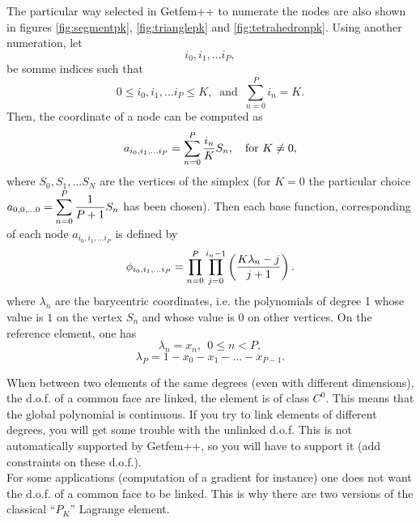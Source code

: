\documentclass[10pt,a4paper]{article}
\begin{document}
The particular way selected in {\sc Getfem++} to numerate the nodes are also shown in figures \ref{fig:segmentpk}, \ref{fig:trianglepk} and \ref{fig:tetrahedronpk}. Using another numeration, let 
$$ i_0, i_1, ... i_P, $$
be somme indices such that
$$ 0 \leq i_0, i_1, ... i_P \leq K, \ \mbox{ and } \ \sum_{n = 0}^{P} i_n = K.$$
Then, the coordinate of a node can be computed as
$$ a_{i_0, i_1, ... i_P} = \sum_{n = 0}^{P} {\displaystyle \frac{\displaystyle i_n}{\displaystyle K}}S_n, \ \ \mbox{ for } K \neq 0, $$
where $S_0, S_1, ... S_N$ are the vertices of the simplex (for $K = 0$ the particular choice $a_{0, 0, ... 0} = \displaystyle \sum_{n = 0}^{P} {\displaystyle \frac{\displaystyle 1}{\displaystyle P+1}}S_n$ has been chosen).
Then each base function, corresponding of each node $a_{i_0, i_1, ... i_P}$ is defined by
$$ \phi_{i_0, i_1, ... i_P} = \prod_{n = 0}^{P} \prod_{j=0}^{i_n-1} \left({\displaystyle \frac{\displaystyle K \lambda_n - j}{\displaystyle j+1}}\right).$$
where $\lambda_n$ are the barycentric coordinates, i.e. the polynomials of degree 1 whose value is $1$ on the vertex $S_n$ and whose value is $0$ on other vertices. On the reference element, one has
$$ \lambda_n = x_n, \ \ 0 \leq n < P, $$
$$ \lambda_P = 1 - x_0 - x_1 - ... - x_{P-1}. $$

When between two elements of the same degrees (even with different dimensions), the d.o.f. of a common face are linked, the element is of class $C^0$. This means that the global polynomial is continuous. If you try to link elements of different degrees, you will get some trouble with the unlinked d.o.f. This is not automatically supported by {\sc Getfem++}, so you will have to support it (add constraints on these d.o.f.).\\

For some applications (computation of a gradient for instance) one does not want the d.o.f. of a common face to be linked. This is why there are two versions of the classical ``$P_K$'' Lagrange element.\\[1cm]
\end{document}

